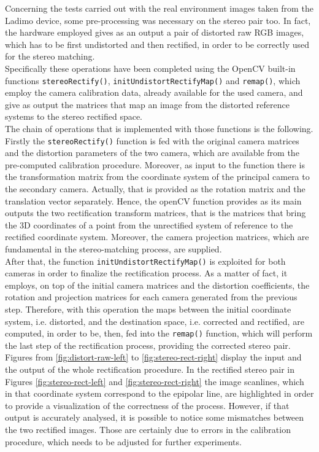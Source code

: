 Concerning the tests carried out with the real environment images taken from the Ladimo device, some pre-processing was necessary on the stereo pair too. 
In fact, the hardware employed gives as an output a pair of distorted raw RGB images, which has to be first undistorted and then rectified, in order to be correctly used for the stereo matching. \\
Specifically these operations have been completed using the OpenCV built-in functions \texttt{stereoRectify()}, \texttt{initUndistortRectifyMap()} and \texttt{remap()}, which employ the camera calibration data, already available for the used camera, and give as output the matrices that map an image from the distorted reference systems to the stereo rectified space.\\
The chain of operations that is implemented with those functions is the following.
Firstly the \texttt{stereoRectify()} function is fed with the original camera matrices and the distortion parameters of the two camera, which are available from the pre-computed calibration procedure.
Moreover, as input to the function there is the transformation matrix from the coordinate system of the principal camera to the secondary camera.
Actually, that is provided as the rotation matrix and the translation vector separately.
Hence, the openCV function provides as its main outputs the two rectification transform matrices, that is the matrices that bring the 3D coordinates of a point from the unrectified system of reference to the rectified coordinate system.
Moreover, the camera projection matrices, which are fundamental in the stereo-matching process, are supplied.\\
After that, the function \texttt{initUndistortRectifyMap()} is exploited for both cameras in order to finalize the rectification process.
As a matter of fact, it employs, on top of the initial camera matrices and the distortion coefficients, the rotation and projection matrices for each camera generated from the previous step.
Therefore, with this operation the maps between the initial coordinate system, i.e. distorted, and the destination space, i.e. corrected and rectified, are computed, in order to be, then, fed into the \texttt{remap()} function, which will perform the last step of the rectification process, providing the corrected stereo pair. \\
Figures from \ref{fig:distort-raw-left} to \ref{fig:stereo-rect-right} display the input and the output of the whole rectification procedure.
In the rectified stereo pair in Figures \ref{fig:stereo-rect-left} and \ref{fig:stereo-rect-right} the image scanlines, which in that coordinate system correspond to the epipolar line, are highlighted in order to provide a visualization of the correctness of the process.
However, if that output is accurately analysed, it is possible to notice some mismatches between the two rectified images.
Those are certainly due to errors in the calibration procedure, which needs to be adjusted for further experiments.

